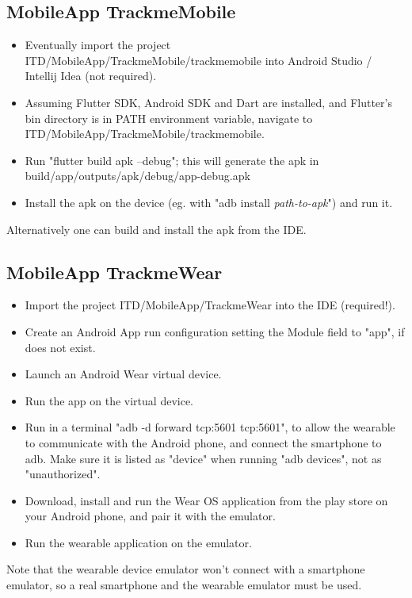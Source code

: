 \documentclass[../main.tex]{subfiles}
\begin{document}
\subsection{MobileApp TrackmeMobile}

\begin{itemize}
	\item Eventually import the project ITD/MobileApp/TrackmeMobile/trackmemobile into Android Studio / Intellij Idea (not required).
	\item Assuming Flutter SDK, Android SDK and Dart are installed, and Flutter's bin directory is in PATH environment variable, navigate to ITD/MobileApp/TrackmeMobile/trackmemobile.
	\item Run "flutter build apk --debug"; this will generate the apk in build/app/outputs/apk/debug/app-debug.apk
	\item Install the apk on the device (eg. with "adb install \textit{path-to-apk}") and run it.
\end{itemize}

Alternatively one can build and install the apk from the IDE.

\subsection{MobileApp TrackmeWear}

\begin{itemize}
	\item Import the project ITD/MobileApp/TrackmeWear into the IDE (required!).
	\item Create an Android App run configuration setting the Module field to "app", if does not exist.
	\item Launch an Android Wear virtual device.
	\item Run the app on the virtual device.
	\item Run in a terminal "adb -d forward tcp:5601 tcp:5601", to allow the wearable to communicate with the Android phone, and connect the smartphone to adb. Make sure it is listed as "device" when running "adb devices", not as "unauthorized".
	\item Download, install and run the Wear OS application from the play store on your Android phone, and pair it with the emulator.
	\item Run the wearable application on the emulator.
\end{itemize}

Note that the wearable device emulator won't connect with a smartphone emulator, so a real smartphone and the wearable emulator must be used.
\end{document}

